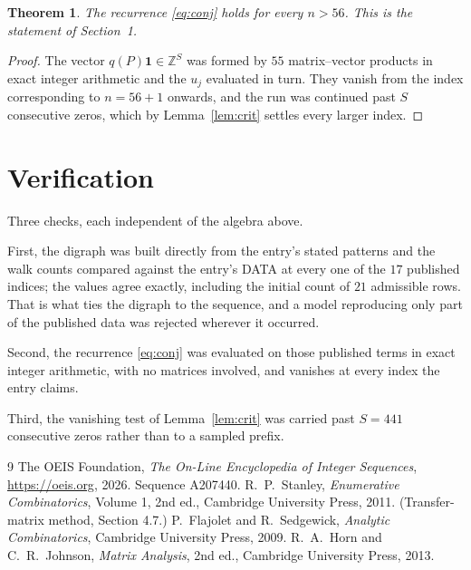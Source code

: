 \documentclass[11pt,a4paper]{article}
\theoremstyle{plain}
\newtheorem{theorem}{Theorem}
\theoremstyle{definition}
\begin{document}
\begin{theorem}
The recurrence \eqref{eq:conj} holds for every $n>56$. This is the statement of
Section~1.
\end{theorem}

\begin{proof}
The vector $q(P)\mathbf{1}\in\mathbb{Z}^{S}$ was formed by $55$ matrix--vector
products in exact integer arithmetic and the $u_j$ evaluated in turn. They vanish from the
index corresponding to $n=56+1$ onwards, and the run was continued past $S$ consecutive
zeros, which by Lemma~\ref{lem:crit} settles every larger index.
\end{proof}

\section{Verification}

Three checks, each independent of the algebra above.

First, the digraph was built directly from the entry's stated patterns and the walk counts
compared against the entry's DATA at every one of the $17$ published indices; the
values agree exactly, including the initial count of $21$ admissible rows. That is
what ties the digraph to the sequence, and a model reproducing only part of the published
data was rejected wherever it occurred.

Second, the recurrence \eqref{eq:conj} was evaluated on those published terms in exact
integer arithmetic, with no matrices involved, and vanishes at every index the entry claims.

Third, the vanishing test of Lemma~\ref{lem:crit} was carried past $S=441$ consecutive
zeros rather than to a sampled prefix.

\begin{thebibliography}{9}
 The OEIS Foundation, \emph{The On-Line Encyclopedia of Integer
Sequences}, \url{https://oeis.org}, 2026. Sequence A207440.
 R.~P.~Stanley, \emph{Enumerative Combinatorics}, Volume 1, 2nd ed.,
Cambridge University Press, 2011. (Transfer-matrix method, Section 4.7.)
 P.~Flajolet and R.~Sedgewick, \emph{Analytic Combinatorics}, Cambridge
University Press, 2009.
 R.~A.~Horn and C.~R.~Johnson, \emph{Matrix Analysis}, 2nd ed., Cambridge
University Press, 2013.
\end{thebibliography}
\end{document}
